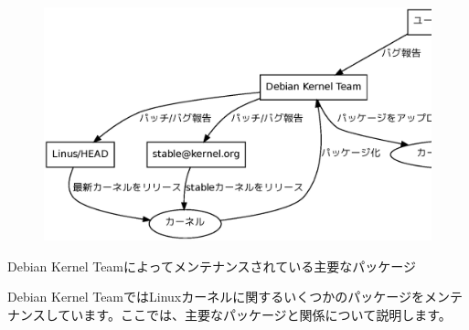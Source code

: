 \begin{frame}[containsverbatim]
\begin{figure}[H]
\begin{center}
\includegraphics[width=1.1\hsize]{image201005/debian-kernel-devel.eps}
\end{center}
\end{figure}
\end{frame}

\begin{frame}[containsverbatim]{Debian Kernel Teamによってメンテナンスされている主要なパッケージ}

Debian Kernel TeamではLinuxカーネルに関するいくつかのパッケージをメンテ
ナンスしています。ここでは、主要なパッケージと関係について説明します。
\end{frame}

